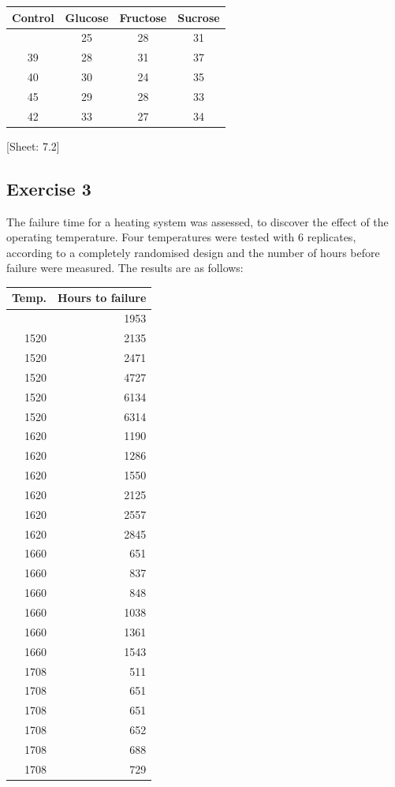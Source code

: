 \documentclass[a4paper,12pt,oneside]{book}
\begin{document}
\begin{longtable}[]{@{}cccc@{}}
\toprule\noalign{}
Control & Glucose & Fructose & Sucrose \\
\midrule\noalign{}
\endhead
\bottomrule\noalign{}
\endlastfoot
45 & 25 & 28 & 31 \\
39 & 28 & 31 & 37 \\
40 & 30 & 24 & 35 \\
45 & 29 & 28 & 33 \\
42 & 33 & 27 & 34 \\
\end{longtable}

{[}Sheet: 7.2{]}

\hypertarget{exercise-3-5}{%
\subsection{Exercise 3}\label{exercise-3-5}}

The failure time for a heating system was assessed, to discover the effect of the operating temperature. Four temperatures were tested with 6 replicates, according to a completely randomised design and the number of hours before failure were measured.
The results are as follows:

\begin{longtable}[]{@{}rr@{}}
\toprule\noalign{}
Temp. & Hours to failure \\
\midrule\noalign{}
\endhead
\bottomrule\noalign{}
\endlastfoot
1520 & 1953 \\
1520 & 2135 \\
1520 & 2471 \\
1520 & 4727 \\
1520 & 6134 \\
1520 & 6314 \\
1620 & 1190 \\
1620 & 1286 \\
1620 & 1550 \\
1620 & 2125 \\
1620 & 2557 \\
1620 & 2845 \\
1660 & 651 \\
1660 & 837 \\
1660 & 848 \\
1660 & 1038 \\
1660 & 1361 \\
1660 & 1543 \\
1708 & 511 \\
1708 & 651 \\
1708 & 651 \\
1708 & 652 \\
1708 & 688 \\
1708 & 729 \\
\end{longtable}
\end{document}
